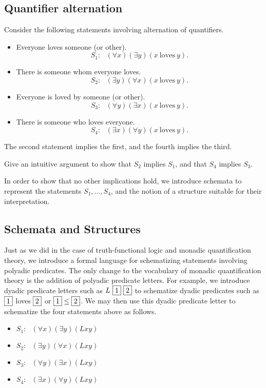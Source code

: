 

\subsection*{Quantifier alternation}
Consider the following statements involving alternation of quantifiers.
\begin{itemize}
\item
Everyone loves someone (or other).
\[S_1:\ \ \ (\forall x)(\exists y)(x\ \mathrm{loves}\ y).\]
\item
There is someone whom everyone loves.
\[S_2:\ \ \ (\exists y)(\forall x)(x\ \mathrm{loves}\ y).\]
\item
Everyone is loved by someone (or other).
\[S_3:\ \ \ (\forall y)(\exists x)(x\ \mathrm{loves}\ y).\]
\item
There is someone who loves everyone.
\[S_4:\ \ \ (\exists x)(\forall y)(x\ \mathrm{loves}\ y).\]
\end{itemize}
The second statement implies the first, and the fourth implies the third. 
\begin{aside}
    Give an intuitive argument to show %
    that $S_2$ implies $S_1$, and that $S_4$ implies $S_3$. 
\end{aside}

In order to show that no other implications hold,
we introduce schemata to represent the statements $S_1,\ldots,S_4$, and the notion of a structure suitable for their interpretation.

\subsection*{Schemata and Structures}

Just as we did in the case of truth-functional logic and monadic quantification theory, we introduce a formal language for schematizing statements involving polyadic predicates. The only change to the vocabulary of monadic quantification theory is the addition of polyadic predicate letters. For example, we introduce dyadic predicate letters such as $L\ \fbox{1}\ \fbox{2}$ to schematize dyadic predicates such as $\fbox{1}$ loves $\fbox{2}$ or $\fbox{1}\leq \fbox{2}$.
We may then use this dyadic predicate letter to schematize the four statements above as follows.
\begin{itemize}
\item $S_1:\ \ \ (\forall x)(\exists y)(Lxy)$
\item $S_2:\ \ \ (\exists y)(\forall x)(Lxy)$
\item $S_3:\ \ \ (\forall y)(\exists x)(Lxy)$
\item $S_4:\ \ \ (\exists x)(\forall y)(Lxy)$
\end{itemize}

